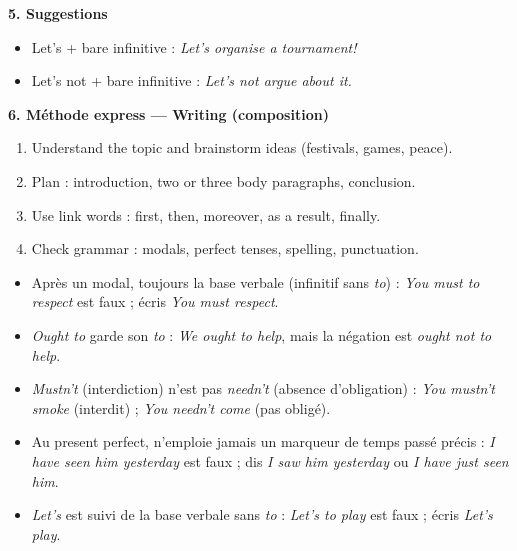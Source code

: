 \documentclass[11pt]{article}
\newcommand{\cle}[1]{{\popxbold\color{popdark}#1}}
\begin{document}
\begin{aretenir}
\textbf{5. Suggestions}
\begin{itemize}
\item \cle{Let's + bare infinitive} : \emph{Let's organise a tournament!}
\item \cle{Let's not + bare infinitive} : \emph{Let's not argue about it.}
\end{itemize}

\textbf{6. Méthode express — Writing (composition)}
\begin{enumerate}
\item Understand the topic and brainstorm ideas (festivals, games, peace).
\item Plan : introduction, two or three body paragraphs, conclusion.
\item Use link words : first, then, moreover, as a result, finally.
\item Check grammar : modals, perfect tenses, spelling, punctuation.
\end{enumerate}
\end{aretenir}

\begin{attention}
\begin{itemize}
\item Après un modal, toujours la \cle{base verbale} (infinitif sans \emph{to}) : \emph{You must to respect} est faux ; écris \emph{You must respect}.
\item \emph{Ought to} garde son \emph{to} : \emph{We ought to help}, mais la négation est \emph{ought not to help}.
\item \emph{Mustn't} (interdiction) n'est pas \emph{needn't} (absence d'obligation) : \emph{You mustn't smoke} (interdit) ; \emph{You needn't come} (pas obligé).
\item Au present perfect, n'emploie jamais un marqueur de temps passé précis : \emph{I have seen him yesterday} est faux ; dis \emph{I saw him yesterday} ou \emph{I have just seen him}.
\item \emph{Let's} est suivi de la base verbale sans \emph{to} : \emph{Let's to play} est faux ; écris \emph{Let's play}.
\end{itemize}
\end{attention}
\end{document}
